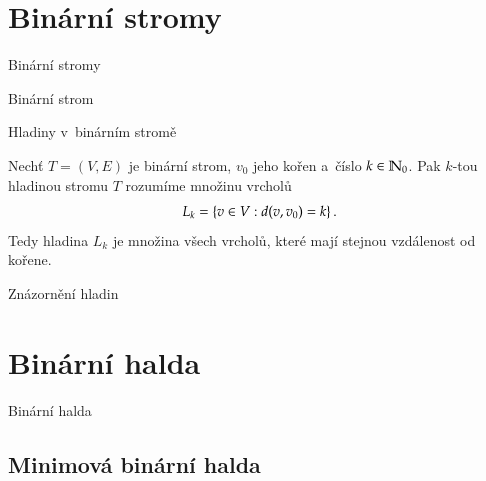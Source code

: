\documentclass[11pt,professionalfont,aspectratio=43]{beamer}
\begin{document}
    

    \section{Binární stromy}

    \begin{titleframeenv}{Binární stromy}
    \end{titleframeenv}

    \begin{frame}{Binární strom}
    \end{frame}

    \begin{frame}{Hladiny v~binárním stromě}
        \begin{defblock}[Hladina]
            Nechť $T=(V,E)$ je binární strom, $v_0$ jeho kořen a~číslo $k\in\mathbb{N}_0$. Pak $k$-tou hladinou stromu $T$ rozumíme množinu vrcholů
            \[L_k=\left\{v\in V: d(v,v_0)=k\right\}.\]
            Tedy hladina $L_k$ je množina všech vrcholů, které mají stejnou vzdálenost od kořene.
        \end{defblock}
    \end{frame}

    \begin{frame}{Znázornění hladin}
    \end{frame}

    \section{Binární halda}

    \begin{titleframeenv}{Binární halda}
    \end{titleframeenv}

    \subsection{Minimová binární halda}
\end{document}
